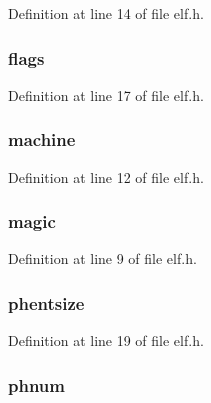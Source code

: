 Definition at line 14 of file elf.\-h.

\hypertarget{structelfhdr_a660f9db871d26052904976a8bfe8432d}{
\subsubsection[{flags}]{ flags}}\label{structelfhdr_a660f9db871d26052904976a8bfe8432d}


Definition at line 17 of file elf.\-h.

\hypertarget{structelfhdr_a46b8328012e01f0b16e4beab95b35911}{
\subsubsection[{machine}]{ machine}}\label{structelfhdr_a46b8328012e01f0b16e4beab95b35911}


Definition at line 12 of file elf.\-h.

\hypertarget{structelfhdr_a8f1cc7c49919fce5697bfbafc073003e}{
\subsubsection[{magic}]{ magic}}\label{structelfhdr_a8f1cc7c49919fce5697bfbafc073003e}


Definition at line 9 of file elf.\-h.

\hypertarget{structelfhdr_a2c1e074fc943b8556ed9b73af4dca3b3}{
\subsubsection[{phentsize}]{ phentsize}}\label{structelfhdr_a2c1e074fc943b8556ed9b73af4dca3b3}


Definition at line 19 of file elf.\-h.

\hypertarget{structelfhdr_ab01d40cd4ae38ce7b110d34cc0310a6b}{
\subsubsection[{phnum}]{ phnum}}\label{structelfhdr_ab01d40cd4ae38ce7b110d34cc0310a6b}


